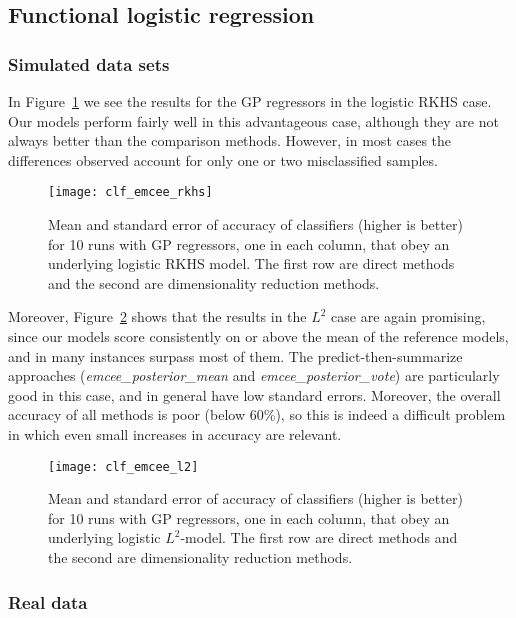 \documentclass{article}
\numberwithin{equation}{section}
\theoremstyle{plain}
\begin{document}
\subsection{Functional logistic regression}\label{sec:experiments-logistic}

\subsubsection*{Simulated data sets}

In Figure~\ref{fig:clf_emcee_rkhs} we see the results for the GP regressors in the logistic RKHS case. Our models perform fairly well in this advantageous case, although they are not always better than the comparison methods. However, in most cases the differences observed account for only one or two misclassified samples. 


\begin{figure}[ht!]
  \centering
  \texttt{[image: clf\_emcee\_rkhs]}
  \caption{Mean and standard error of accuracy of classifiers (higher is better) for 10 runs with GP regressors, one in each column, that obey an underlying logistic RKHS model. The first row are direct methods and the second are dimensionality reduction methods.}\label{fig:clf_emcee_rkhs}
\end{figure}

Moreover, Figure~\ref{fig:clf_emcee_l2} shows that the results in the \(L^2\) case are again promising, since our models score consistently on or above the mean of the reference models, and in many instances surpass most of them. The predict-then-summarize approaches (\textit{emcee\_posterior\_mean} and \textit{emcee\_posterior\_vote}) are particularly good in this case, and in general have low standard errors. Moreover, the overall accuracy of all methods is poor (below 60\%), so this is indeed a difficult problem in which even small increases in accuracy are relevant.

\begin{figure}[ht!]
  \centering
  \texttt{[image: clf\_emcee\_l2]}
  \caption{Mean and standard error of accuracy of classifiers (higher is better) for 10 runs with GP regressors, one in each column, that obey an underlying logistic \(L^2\)-model. The first row are direct methods and the second are dimensionality reduction methods.}\label{fig:clf_emcee_l2}
\end{figure}

\subsubsection*{Real data}
\end{document}
